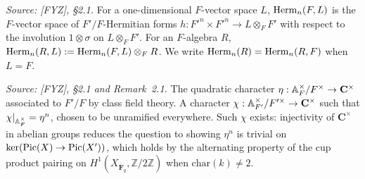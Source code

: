 \begin{definition}
  \label{def:hermitian-spaces}
  \textit{Source: [FYZ], \S2.1.}
  For a one-dimensional \(F\)-vector space \(L\), \(\operatorname{Herm}_n(F, L)\) is the
  \(F\)-vector space of \(F'/F\)-Hermitian forms
  \(h : F'^n \times F'^n \to L \otimes_F F'\) with respect to the involution
  \(1 \otimes \sigma\) on \(L \otimes_F F'\). For an \(F\)-algebra \(R\),
  \(\operatorname{Herm}_n(R, L) := \operatorname{Herm}_n(F, L) \otimes_F R\). We write \(\operatorname{Herm}_n(R) =
  \operatorname{Herm}_n(R, F)\) when \(L = F\).
\end{definition}

\begin{definition}
  \label{def:chi-character}
  \textit{Source: [FYZ], \S2.1 and Remark~2.1.}
  The quadratic character \(\eta : \mathbb{A}_F^\times / F^\times \to \mathbf{C}^\times\)
  associated to \(F'/F\) by class field theory.  A character
  \(\chi : \mathbb{A}_{F'}^\times / F'^\times \to \mathbf{C}^\times\) such that
  \(\chi|_{\mathbb{A}_F^\times} = \eta^n\), chosen to be unramified everywhere. Such \(\chi\)
  exists: injectivity of \(\mathbf{C}^\times\) in abelian groups reduces the question to
  showing \(\eta^n\) is trivial on \(\ker(\mathrm{Pic}(X) \to \mathrm{Pic}(X'))\), which holds by the
  alternating property of the cup product pairing on
  \(H^1(X_{\overline{\mathbf{F}}_q}, \mathbb{Z}/2\mathbb{Z})\) when \(\mathrm{char}(k) \neq 2\).
\end{definition}

